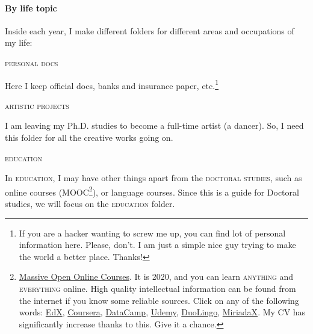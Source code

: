 \documentclass{article}
\begin{document}
\paragraph{By life topic}
\label{parag: topic}
Inside each year, I make different folders for different areas and occupations of my life: 
\begin{center}
  \textsc{personal docs} 
\end{center}
Here I keep official docs, banks and insurance paper, etc.\footnote{If you are a hacker wanting to screw me up, you can find lot of personal information here. Please, don’t. I am just a simple nice guy trying to make the world a better place. Thanks!}
\begin{center}
   \textsc{artistic projects}
\end{center}
I am leaving my Ph.D. studies to become a full-time artist (a dancer). So, I need this folder for all the creative works going on.
\begin{center}
    \textsc{education}
\end{center}
In \textsc{education}, I may have other things apart from the \textsc{doctoral studies}, such as online courses (\textsc{MOOC}\footnote{\href{ https://www.mooc.org/}{Massive Open Online Courses}. It is 2020, and you can learn \textsc{anything} and \textsc{everything} online. High quality intellectual information can be found from the internet if you know some reliable sources. Click on any of the following words: \href{https://www.edx.org/}{EdX}, \href{https://www.coursera.org/}{Coursera}, \href{https://www.datacamp.com/}{DataCamp}, \href{https://www.udemy.com/}{Udemy}, \href{https://www.duolingo.com/}{DuoLingo}, \href{https://miriadax.net/home}{MiriadaX}. My CV has significantly increase thanks to this. Give it a chance.}), or language courses. Since this is a guide for Doctoral studies, we will focus on the \textsc{education} folder.
\end{document}
